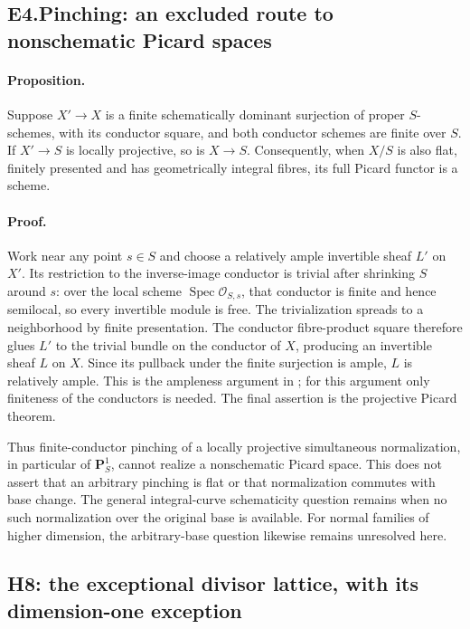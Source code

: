 \subsection*{E4.Pinching: an excluded route to nonschematic Picard spaces}

\paragraph{Proposition.}
Suppose $X'\to X$ is a finite schematically dominant surjection
of proper $S$-schemes, with its conductor square, and both conductor schemes are finite over
$S$. If $X'\to S$ is locally projective, so is $X\to S$.
Consequently, when $X/S$ is also flat, finitely presented and has
geometrically integral fibres, its full Picard functor is a scheme.

\paragraph{Proof.}
Work near any point $s\in S$ and choose a relatively ample invertible
sheaf $L'$ on $X'$. Its restriction to the inverse-image conductor is
trivial after shrinking $S$ around $s$: over the local scheme
$\operatorname{Spec}\mathcal O_{S,s}$, that conductor is finite and
hence semilocal, so every invertible module is free. The trivialization
spreads to a neighborhood by finite presentation. The conductor
fibre-product square therefore glues $L'$ to the trivial bundle on
the conductor of $X$, producing an invertible sheaf $L$ on $X$.
Since its pullback under the finite surjection is ample, $L$ is
relatively ample. This is the ampleness argument in
\cite[Proposition~2.4(i), p.~6]{BCEBrion2015}; for this argument only
finiteness of the conductors is needed. The final assertion is the
projective Picard theorem.

Thus finite-conductor pinching of a locally projective simultaneous
normalization, in particular of $\mathbf P^1_S$, cannot realize a
nonschematic Picard space. This does not assert that an arbitrary
pinching is flat or that normalization commutes with base change.
The general integral-curve schematicity question remains when no
such normalization over the original base is available. For normal
families of higher dimension, the arbitrary-base question likewise
remains unresolved here.



\subsection{H8: the exceptional divisor lattice, with its dimension-one exception}

